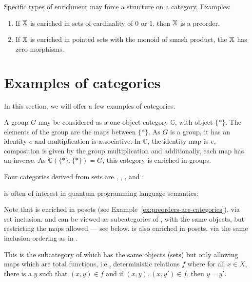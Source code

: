 Specific types of enrichment may force a structure on a category. Examples:
\begin{enumerate}
 \item If $\mathbb{X}$ is enriched in sets of cardinality of 0 or 1, then $\mathbb{X}$ is a preorder.
 \item If $\mathbb{X}$ is enriched in pointed sets with the monoid of smash product, the $\mathbb{X}$ has zero morphisms.
\end{enumerate}


\section{Examples of categories} %
\label{sub:examples_of_categories}
In this section, we will offer a few examples of categories.

\begin{example}
  A group $G$ may be considered as a one-object category $\mathbb{G}$, with object $\{*\}$. The elements of the
  group are the maps between $\{*\}$. As $G$ is a group, it has an identity $e$ and multiplication is
  associative. In $\mathbb{G}$, the identity map is $e$, composition is given
  by the group multiplication and additionally, each map has an inverse. As $\mathbb{G}(\{*\},\{*\})
  = G$, this category is enriched in groups.
\end{example}

Four categories derived from sets are \rel, \sets, \Par, and \pinj:

\begin{example}[\rel]\label{ex:category_rel}
\rel is often of interest in quantum programming language semantics:
\end{example}


Note that \rel is enriched in posets (see Example~\ref{ex:preorders-are-categories}), via set
inclusion. \sets and \Par can be viewed as subcategories of \rel, with the same objects, but
restricting the maps allowed --- see below. \Par is also enriched in posets, via the same inclusion
ordering as in \rel.

\begin{example}[\sets]\label{ex:category_sets}
This is the subcategory of \rel which has the same  objects (sets) but only allowing maps which are
total functions, i.e., deterministic relations $f$ where for all $x\in X$, there is a $y$ such
that $(x,y)\in f$ and if $(x,y), (x,y') \in f$, then $y = y'$.
\end{example}

